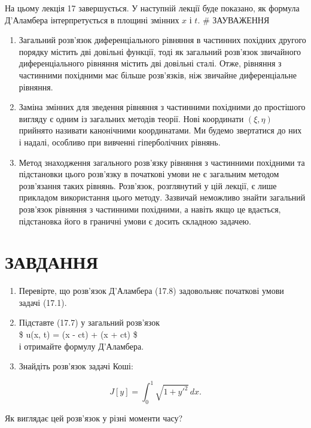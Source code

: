 \documentclass[
  ukrainian,
]{article}
\begin{document}
На цьому лекція 17 завершується. У наступній лекції буде показано, як
формула Д'Аламбера інтерпретується в площині змінних \(x\) і \(t\). \#
ЗАУВАЖЕННЯ

\begin{enumerate}
\def\labelenumi{\arabic{enumi}.}
\item
  Загальний розв'язок диференціального рівняння в частинних похідних
  другого порядку містить дві довільні функції, тоді як загальний
  розв'язок звичайного диференціального рівняння містить дві довільні
  сталі. Отже, рівняння з частинними похідними має більше розв'язків,
  ніж звичайне диференціальне рівняння.
\item
  Заміна змінних для зведення рівняння з частинними похідними до
  простішого вигляду є одним із загальних методів теорії. Нові
  координати \((\xi, \eta)\) прийнято називати канонічними координатами.
  Ми будемо звертатися до них і надалі, особливо при вивченні
  гіперболічних рівнянь.
\item
  Метод знаходження загального розв'язку рівняння з частинними похідними
  та підстановки цього розв'язку в початкові умови не є загальним
  методом розв'язання таких рівнянь. Розв'язок, розглянутий у цій
  лекції, є лише прикладом використання цього методу. Зазвичай неможливо
  знайти загальний розв'язок рівняння з частинними похідними, а навіть
  якщо це вдається, підстановка його в граничні умови є досить складною
  задачею.
\end{enumerate}

\section{ЗАВДАННЯ}\label{ux437ux430ux432ux434ux430ux43dux43dux44f-12}

\begin{enumerate}
\def\labelenumi{\arabic{enumi}.}
\item
  Перевірте, що розв'язок Д'Аламбера (17.8) задовольняє початкові умови
  задачі (17.1).
\item
  Підставте (17.7) у загальний розв'язок\\
  \$ u(x, t) = \psi(x - ct) + \psi(x + ct) \$\\
  і отримайте формулу Д'Аламбера.
\item
  Знайдіть розв'язок задачі Коші:
\end{enumerate}

\[
J[y] = \int_{0}^{1} \sqrt{1 + y'^{2}}\,dx.
\]

Як виглядає цей розв'язок у різні моменти часу?
\end{document}
